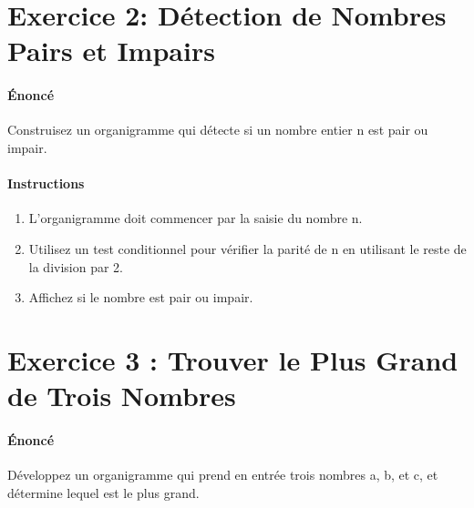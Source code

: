 \documentclass[11pt, a4paper]{article}
\begin{document}
\newpage

\section*{Exercice 2: Détection de Nombres Pairs et Impairs}

\paragraph{Énoncé}
Construisez un organigramme qui détecte si un nombre entier n est pair ou impair.

\paragraph{Instructions}
\begin{enumerate}
    \item L'organigramme doit commencer par la saisie du nombre n.
    \item Utilisez un test conditionnel pour vérifier la parité de n en utilisant le reste de la division par 2.
    \item Affichez si le nombre est pair ou impair.
\end{enumerate}

\begin{center}
\end{center}

\section*{Exercice 3 : Trouver le Plus Grand de Trois Nombres}

\paragraph{Énoncé}
Développez un organigramme qui prend en entrée trois nombres a, b, et c, et détermine lequel est le plus grand.
\end{document}
